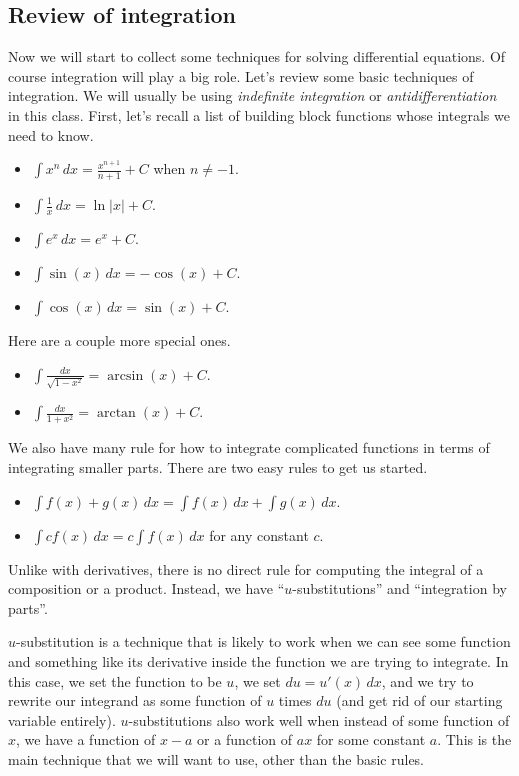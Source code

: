 \documentclass[12pt]{amsart}
\numberwithin{equation}{section}
\theoremstyle{plain} %
\theoremstyle{definition}
\theoremstyle{remark}
\begin{document}
\subsection*{Review of integration} Now we will start to collect some techniques for solving differential equations. Of course integration will play a big role. Let's review some basic techniques of integration. We will usually be using \emph{indefinite integration} or \emph{antidifferentiation} in this class. First, let's recall a list of building block functions whose integrals we need to know. 

\begin{itemize}
\item $\int x^n \, dx = \frac{x^{n+1}}{n+1} + C$ when $n\neq -1$.
\item $\int \frac{1}{x} \, dx = \ln|x| + C$.
\item $\int e^x \, dx = e^x + C$.
\item $\int \sin(x) \, dx = -\cos(x) + C$.
\item $\int \cos(x) \, dx = \sin(x) + C$.
\end{itemize}

Here are a couple more special ones.

\begin{itemize}
\item $\int \frac{dx}{\sqrt{1-x^2}} = \arcsin(x) + C$.
\item $\int \frac{dx}{1 + x^2} = \arctan(x) + C$.
\end{itemize}

We also have many rule for how to integrate complicated functions in terms of integrating smaller parts. There are two easy rules to get us started.

\begin{itemize}
\item $\int f(x) + g(x) \, dx = \int f(x)  \, dx + \int g(x) \, dx$.
\item $ \int c f(x) \, dx = c \int f(x)  \, dx$ for any constant $c$.
\end{itemize}

Unlike with derivatives, there is no direct rule for computing the integral of a composition or a product. Instead, we have ``$u$-substitutions'' and ``integration by parts''. 

$u$-substitution is a technique that is likely to work when we can see some function and something like its derivative inside the function we are trying to integrate. In this case, we set the function to be $u$, we set $du= u'(x) \, dx$, and we try to rewrite our integrand as some function of $u$  times $du$ (and get rid of our starting variable entirely). $u$-substitutions also work well when instead of some function of $x$, we have a function of $x-a$ or a function of $ax$ for some constant $a$.
This is the main technique that we will want to use, other than the basic rules.
\end{document}

